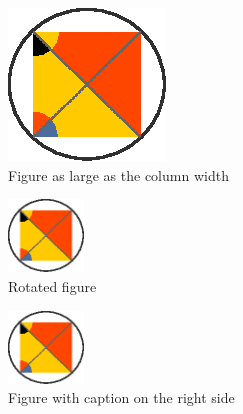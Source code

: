 \documentclass{aa}
\begin{document}
   \begin{figure}[h!]
   \centering
   \includegraphics[width=\hsize]{figure.eps}
      \caption{Figure as large as the column width}
         \label{fig1}
   \end{figure}
%
   \begin{figure}[h!]
   \centering
   \includegraphics[angle=-90,width=2cm]{figure.eps}
      \caption{Rotated figure}
         \label{fig2}
   \end{figure}
%
   \begin{figure}[h!]
   \sidecaption
   \includegraphics[width=2cm]{figure.eps}
      \caption{Figure with caption on the right side}
         \label{fig3}
   \end{figure}
\end{document}

